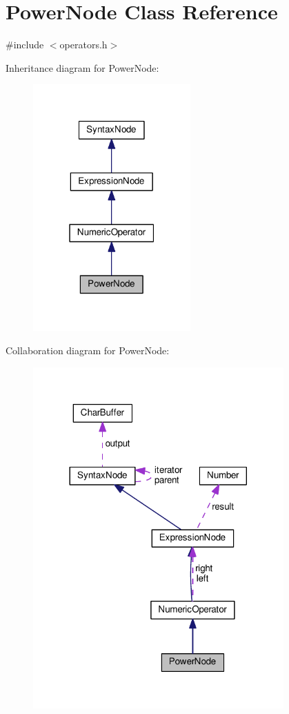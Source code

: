 \hypertarget{classPowerNode}{}\section{Power\+Node Class Reference}
\label{classPowerNode}


{\ttfamily \#include $<$operators.\+h$>$}



Inheritance diagram for Power\+Node\+:\nopagebreak
\begin{figure}[H]
\begin{center}
\leavevmode
\includegraphics[width=171pt]{classPowerNode__inherit__graph}
\end{center}
\end{figure}


Collaboration diagram for Power\+Node\+:\nopagebreak
\begin{figure}[H]
\begin{center}
\leavevmode
\includegraphics[width=272pt]{classPowerNode__coll__graph}
\end{center}
\end{figure}
